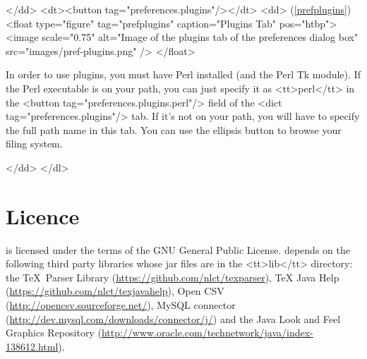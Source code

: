     </dd>
    <dt><button tag="preferences.plugins"/></dt>
    <dd>
        (\autoref{prefplugins})
     <float type="figure" tag="prefplugins" caption="Plugins Tab" pos="htbp">
      <image scale="0.75" alt="Image of the plugins tab of the preferences dialog box" src="images/pref-plugins.png" />
     </float>

    In order to use  plugins, you must have Perl installed (and the
    Perl Tk module). If the Perl executable is on your path, you can just
    specify it as <tt>perl</tt> in the <button tag="preferences.plugins.perl"/>
    field of the <dict tag="preferences.plugins"/> tab. If it's not on your
    path, you will have to specify the full path name in this tab. You can
    use the ellipsis button to browse your filing system.

    </dd>
   </dl>


\chapter{Licence}
\label{licence}
    is licensed under the terms of the GNU General Public License.
    depends on the following third party libraries whose jar files are
   in the <tt>lib</tt> directory: the \TeX\ Parser Library 
   (\url{https://github.com/nlct/texparser}),
   TeX Java Help 
   (\url{https://github.com/nlct/texjavahelp}),
   Open CSV (\url{http://opencsv.sourceforge.net/}),
   MySQL connector (\url{http://dev.mysql.com/downloads/connector/j/})
   and the Java Look and Feel Graphics Repository
   (\url{http://www.oracle.com/technetwork/java/index-138612.html}).



\printmain
\printindex

